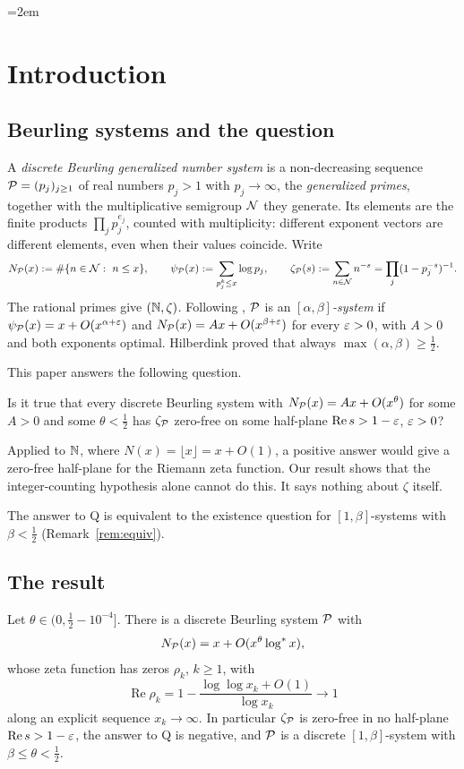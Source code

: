 \begingroup\emergencystretch=2em %
\section{Introduction}\label{sec:intro}

\subsection{Beurling systems and the question}
A \emph{discrete Beurling generalized number system} is a non-decreasing sequence $\mathcal{P}=(p_j)_{j\ge1}$ of real numbers
$p_j>1$ with $p_j\to\infty$, the \emph{generalized primes}, together with the multiplicative semigroup $\mathcal{N}$ they generate.
Its elements are the finite products $\prod_j p_j^{e_j}$, counted with multiplicity: different exponent vectors are
different elements, even when their values coincide. Write
\[
  N_{\mathcal{P}}(x):=\#\{n\in\mathcal{N}:\ n\le x\},\qquad
  \psi_{\mathcal{P}}(x):=\sum_{p_j^k\le x}\log p_j,\qquad
  \zeta_{\mathcal{P}}(s):=\sum_{n\in\mathcal{N}}n^{-s}=\prod_j(1-p_j^{-s})^{-1}.
\]
The rational primes give $(\mathbb{N},\zeta)$. Following \cite{BDR}, $\mathcal{P}$ is an \emph{$[\alpha,\beta]$-system} if
$\psi_{\mathcal{P}}(x)=x+O(x^{\alpha+\varepsilon})$ and $N_{\mathcal{P}}(x)=Ax+O(x^{\beta+\varepsilon})$ for every $\varepsilon>0$, with $A>0$ and both exponents
optimal. Hilberdink \cite{Hilberdink2005} proved that always $\max(\alpha,\beta)\ge\tfrac12$.

This paper answers the following question.

\begin{definition}[Question Q]\label{def:Q}
Is it true that every discrete Beurling system with $N_{\mathcal{P}}(x)=Ax+O(x^{\theta})$ for some $A>0$ and some $\theta<\tfrac12$
has $\zeta_{\mathcal{P}}$ zero-free on some half-plane $\operatorname{Re}s>1-\varepsilon$, $\varepsilon>0$?
\end{definition}

Applied to $\mathbb{N}$, where $N(x)=\lfloor x\rfloor=x+O(1)$, a positive answer would give a zero-free half-plane for the Riemann zeta
function. Our result shows that the integer-counting hypothesis alone cannot do this. It says nothing about $\zeta$ itself.

The answer to Q is equivalent to the existence question for $[1,\beta]$-systems with $\beta<\tfrac12$
(Remark~\ref{rem:equiv}).

\subsection{The result}
\begin{theoremA}
Let $\theta\in(0,\tfrac12-10^{-4}]$. There is a discrete Beurling system $\mathcal{P}$ with
\[
  N_{\mathcal{P}}(x)=x+O(x^{\theta}\log^*x),
\]
whose zeta function has zeros $\rho_k$, $k\ge1$, with
\[
  \operatorname{Re}\rho_k=1-\frac{\log\log x_k+O(1)}{\log x_k}\longrightarrow1
\]
along an explicit sequence $x_k\to\infty$. In particular $\zeta_{\mathcal{P}}$ is zero-free in no half-plane $\operatorname{Re}s>1-\varepsilon$,
the answer to Q is negative, and $\mathcal{P}$ is a discrete $[1,\beta]$-system with $\beta\le\theta<\tfrac12$.
\end{theoremA}


